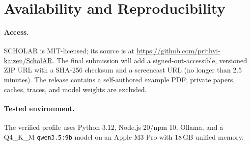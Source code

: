 \section{Availability and Reproducibility}
\label{sec:availability}

\paragraph{Access.}
\textsc{SCHOLAR} is MIT-licensed; its source is at \url{https://github.com/prithvi-kaizen/ScholAR}. The final submission will add a signed-out-accessible, versioned ZIP URL with a SHA-256 checksum and a screencast URL (no longer than 2.5 minutes). The release contains a self-authored example PDF; private papers, caches, traces, and model weights are excluded.

\paragraph{Tested environment.}
The verified profile uses Python 3.12, Node.js 20/npm 10, Ollama, and a Q4\_K\_M \texttt{qwen3.5:9b} model on an Apple M3 Pro with 18\,GB unified memory.
